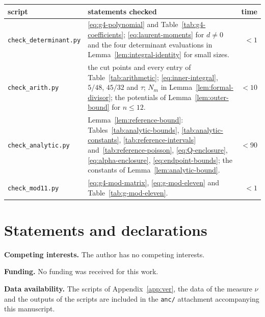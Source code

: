 \documentclass{amsart}
\makeatletter
\numberwithin{equation}{section}
\numberwithin{table}{section}
\newcommand{\captionof}[1]{\def\@captype{#1}\caption}
\makeatother
\begin{document}
\begin{center}\footnotesize
\begin{minipage}{\textwidth}\centering
\captionof{table}{Scripts in \texttt{anc/} and their running times in seconds.}\label{tab:checks}
\begin{tabular}{@{}>{\raggedright\arraybackslash}p{}>{\raggedright\arraybackslash}p{}r@{}}
\hline
script & statements checked & time\\\hline
\texttt{check\_determinant.py}&\eqref{eq:g4-polynomial} and
Table~\ref{tab:g4-coefficients}; \eqref{eq:laurent-moments} for $d\ne0$ and the four
determinant evaluations in Lemma~\ref{lem:integral-identity} for small
sizes.&$<1$\\
\texttt{check\_arith.py}&the cut points and every entry of
Table~\ref{tab:arithmetic}; \eqref{eq:inner-integral}, $5/48$, $45/32$ and
$\tau$; $N_m$ in Lemma~\ref{lem:formal-divisor}; the potentials of
Lemma~\ref{lem:outer-bound} for $n\le12$.&$<10$\\
\texttt{check\_analytic.py}&Lemma~\ref{lem:reference-bound}:
Tables~\ref{tab:analytic-bounds}, \ref{tab:analytic-constants}, \ref{tab:reference-intervals} and~\ref{tab:reference-poisson},
\eqref{eq:Q-enclosure}, \eqref{eq:alpha-enclosure},
\eqref{eq:endpoint-bounds}; the constants of
Lemma~\ref{lem:analytic-bound}.&$<90$\\
\texttt{check\_mod11.py}&\eqref{eq:g4-mod-matrix},
\eqref{eq:g-mod-eleven} and Table~\ref{tab:g-mod-eleven}.&$<1$\\\hline
\end{tabular}
\end{minipage}
\end{center}

\section*{Statements and declarations}

\textbf{Competing interests.} The author has no competing interests.

\textbf{Funding.} No funding was received for this work.

\textbf{Data availability.} The scripts of Appendix~\ref{app:ver}, the
data of the measure $\nu$ and the outputs of the scripts are included in the
\texttt{anc/} attachment accompanying this manuscript.
\end{document}
